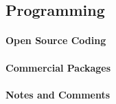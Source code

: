\subsection{Programming}
\paragraph{Open Source Coding}
\paragraph{Commercial Packages}
\paragraph{Notes and Comments}